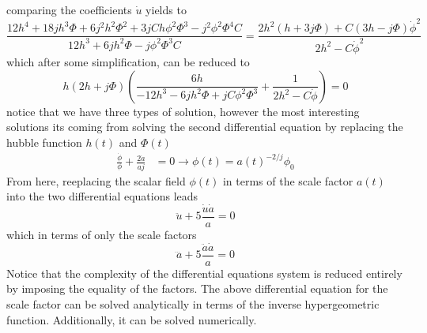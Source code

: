 \documentclass[10pt,a4paper]{article}
\begin{document}
comparing the coefficients $\dot{u}$ yields to
\begin{equation}
  \frac{12h^4 + 18jh^3\Phi + 6j^2h^2\Phi^2 + 3jCh\phi^2\Phi^3 - j^2\phi^2\Phi^4C}{12h^3 + 6jh^2\Phi - j\phi^2\Phi^3 C} = \frac{2h^2\left(h+3j\Phi\right)+C\left(3h - j\Phi\right)\dot{\phi}^2}{2h^2 - C\dot{\phi}^2}
\end{equation}
which after some simplification, can be reduced to
\begin{equation}
  h\left(2h+j\Phi\right)\left(\frac{6h}{-12h^3-6jh^2\Phi +jC\phi^2\Phi^3} + \frac{1}{2h^2 - C\dot{\phi}}\right) = 0
\end{equation}
notice that we have three types of solution, however the most interesting solutions its coming from solving the second differential equation by replacing
the hubble function $h(t)$ and $\Phi(t)$
\begin{align}
  \frac{\dot{\phi}}{\phi} + \frac{2\dot{a}}{aj} & = 0  \to  \phi(t)  = a(t)^{-2/j}\phi_0
\end{align}
From here, reeplacing the scalar field $\phi(t)$ in terms of the scale factor $a(t)$ into the two differential equations leads 
\begin{equation}
  \ddot{u} + 5\frac{\dot{u}\dot{a}}{a} = 0
\end{equation}
which in terms of only the scale factors 
\begin{equation}
  \dddot{a}+ 5\frac{\ddot{a}\dot{a}}{a} = 0
\end{equation}
Notice that the complexity of the differential equations system is reduced entirely by imposing the equality of the factors. The above differential equation
for the scale factor can be solved analytically in terms of the inverse hypergeometric function. Additionally, it can be solved numerically.
\end{document}
